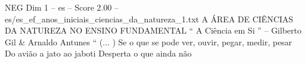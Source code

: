 \begin{textsample}{NEG Dim 1 – es – Score 2.00 – es/es\_ef\_anos\_iniciais\_ciencias\_da\_natureza\_1.txt}  \label{ex:f1_neg_091}
A ÁREA DE CIÊNCIAS DA NATUREZA NO ENSINO FUNDAMENTAL “ A Ciência em Si ” – Gilberto Gil \& Arnaldo Antunes “ (... ) Se o que se pode ver, ouvir, pegar, medir, pesar Do avião a jato ao jaboti Desperta o que ainda não

\end{textsample}
